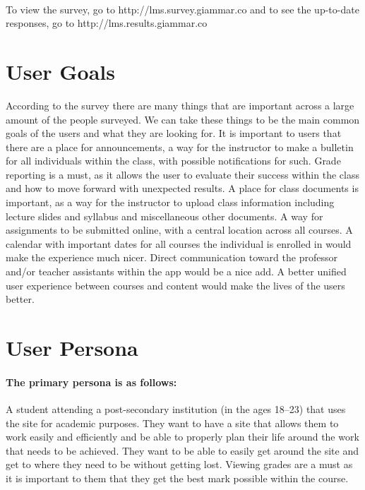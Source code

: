 \documentclass[12pt]{article}
\begin{document}
    \paragraph{}
    To view the survey, go to http://lms.survey.giammar.co and to see the up-to-date\\responses, go to http://lms.results.giammar.co


    \section{User Goals}\label{sec:user-goals}

    According to the survey there are many things that are important across a large amount of the people surveyed.
    We can take these things to be the main common goals of the users and what they are looking for.
    It is important to users that there are a place for announcements, a way for the instructor to make a bulletin for all individuals within the class, with possible notifications for such.
    Grade reporting is a must, as it allows the user to evaluate their success within the class and how to move forward with unexpected results.
    A place for class documents is important, as a way for the instructor to upload class information including lecture slides and syllabus and miscellaneous other documents.
    A way for assignments to be submitted online, with a central location across all courses.
    A calendar with important dates for all courses the individual is enrolled in would make the experience much nicer.
    Direct communication toward the professor and/or teacher assistants within the app would be a nice add.
    A better unified user experience between courses and content would make the lives of the users better.


    \section{User Persona}\label{sec:user-persona}

    \paragraph{The primary persona is as follows:} A student attending a post-secondary institution (in the ages 18--23) that uses the site for academic purposes.
    They want to have a site that allows them to work easily and efficiently and be able to properly plan their life around the work that needs to be achieved.
    They want to be able to easily get around the site and get to where they need to be without getting lost.
    Viewing grades are a must as it is important to them that they get the best mark possible within the course.
\end{document}
